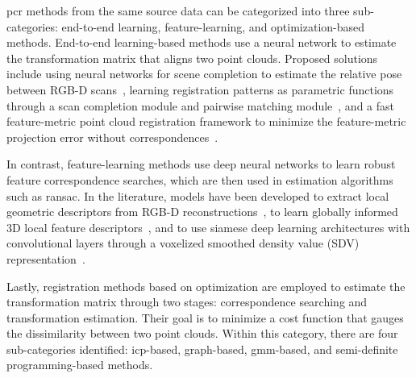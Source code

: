 \gls{pcr} methods from the same source data can be categorized into three sub-categories: end-to-end learning, feature-learning, and optimization-based methods. End-to-end learning-based methods use a neural network to estimate the transformation matrix that aligns two point clouds. Proposed solutions include using neural networks for scene completion to estimate the relative pose between RGB-D scans~\cite{extreme-relative-pose-estimation-for-rgb-d-scans-via-scene-completion}, learning registration patterns as parametric functions through a scan completion module and pairwise matching module~\cite{non-rigid-point-set-registration-networks}, and a fast feature-metric point cloud registration framework to minimize the feature-metric projection error without correspondences~\cite{feature-metric-registration:-a-fast-semi-supervised-approach-for-robust-point-cloud-registration-without-correspondences}.\medskip

In contrast, feature-learning methods use deep neural networks to learn robust feature correspondence searches, which are then used in estimation algorithms such as \gls{ransac}. In the literature, models have been developed to extract local geometric descriptors from RGB-D reconstructions~\cite{3dmatch:-learning-local-geometric-descriptors-from-rgb-d-reconstructions}, to learn globally informed 3D local feature descriptors~\cite{ppfnet:-global-context-aware-local-features-for-robust-3d-point-matching}, and to use siamese deep learning architectures with convolutional layers through a voxelized smoothed density value (SDV) representation~\cite{the-perfect-match:-3d-point-cloud-matching-with-smoothed-densities}. \medskip










Lastly, registration methods based on optimization are employed to estimate the transformation matrix through two stages: correspondence searching and transformation estimation. Their goal is to minimize a cost function that gauges the dissimilarity between two point clouds. Within this category, there are four sub-categories identified: \gls{icp}-based, graph-based, \gls{gmm}-based, and semi-definite programming-based methods. \medskip

